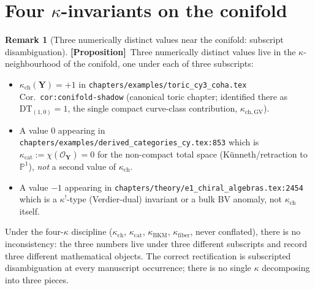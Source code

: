 \documentclass[11pt]{amsart}
\theoremstyle{definition}
\newtheorem{remark}[theorem]{Remark}
\providecommand{\bY}{\mathbf{Y}}
\providecommand{\cO}{\mathcal{O}}
\providecommand{\bP}{\mathbb{P}}
\providecommand{\ClaimStatusProposition}{\textbf{\textsf{[Proposition]}}}
\begin{document}
\section{Four $\kappa$-invariants on the conifold}
\label{sec:kappa-reconciliation}

\begin{remark}[Three numerically distinct values near the conifold:
subscript disambiguation]
\label{rem:kappa-conflict}
\ClaimStatusProposition\
Three numerically distinct values live in the $\kappa$-neighbourhood of
the conifold, one under each of three subscripts:
\begin{itemize}[leftmargin=2em]
\item $\kappa_{\mathrm{ch}}(\bY) = +1$ in \texttt{chapters/examples/toric\_cy3\_coha.tex}
  Cor.~\texttt{cor:conifold-shadow} (canonical toric chapter;
  identified there as $\mathrm{DT}_{(1,0)} = 1$, the single compact
  curve-class contribution, $\kappa_{\mathrm{ch,GV}}$).
\item A value $0$ appearing in
  \texttt{chapters/examples/derived\_categories\_cy.tex:853}
  which is $\kappa_{\mathrm{cat}} := \chi(\cO_{\bY}) = 0$ for the
  non-compact total space (Künneth/retraction to $\bP^1$), \emph{not}
  a second value of $\kappa_{\mathrm{ch}}$.
\item A value $-1$ appearing in
  \texttt{chapters/theory/e1\_chiral\_algebras.tex:2454}
  which is a $\kappa^!$-type (Verdier-dual) invariant or a bulk BV
  anomaly, not $\kappa_{\mathrm{ch}}$ itself.
\end{itemize}
Under the four-$\kappa$ discipline ($\kappa_{\mathrm{ch}}$,
$\kappa_{\mathrm{cat}}$, $\kappa_{\mathrm{BKM}}$, $\kappa_{\mathrm{fiber}}$,
never conflated), there is no inconsistency: the three numbers
live under three different subscripts and record three different
mathematical objects. The correct rectification is subscripted
disambiguation at every manuscript occurrence; there is no single
$\kappa$ decomposing into three pieces.


\end{remark}
\end{document}
